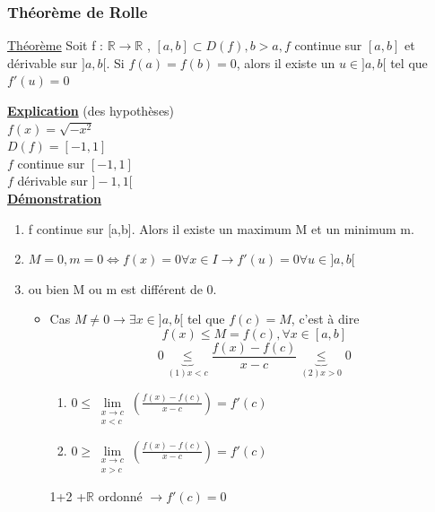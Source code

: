 \documentclass[12pt,a4paper]{article}
\newcommand{\limite}{\lim\limits_}
\newcommand{\llimite}[3]{\limite{\substack{#1 \\ #2}}\left(#3\right)}
\newcommand{\evid}[1]{\textbf{\underline{#1}}}
\newcommand{\R}{\ensuremath{\mathbb{R}} }
\newcommand{\rtor}{\ensuremath{\R \to \R} }
\newcommand{\Theoreme}{\underline{Théorème} }
\begin{document}
{\subsubsection{Théorème de Rolle}
\begin{boite}
	\Theoreme Soit f : \rtor, $[a,b] \subset D(f), b > a, f$ continue sur $[a,b]$ et dérivable sur $]a,b[$. Si $f(a) = f(b) = 0$, alors il existe un $u \in ]a,b[$ tel que $f'(u) = 0$
\end{boite}
\evid{Explication} (des hypothèses)\\
$f(x) = \sqrt{-x^2}$\\
$D(f) = [-1,1]$\\
$f$ continue sur $[-1,1]$\\
$f$ dérivable sur $]-1,1[$\\
\evid{Démonstration}
\begin{enumerate}[label=\roman*]
	\item f continue sur [a,b]. Alors il existe un maximum M et un minimum m.
	\item $M = 0, m = 0 \iff f(x)= 0\forall x \in I \to f'(u) = 0 \forall u \in ]a,b[$
	\item ou bien M ou m est différent de 0.
		\begin{itemize}
			\item Cas $M \neq 0 \to \exists x \in ]a,b[$ tel que $f(c) = M$, c'est à dire
				\begin{equation}
					f(x) \leq M = f(c), \forall x \in [a,b]
				\end{equation}
				\begin{equation}
					0 \underbrace{\leq}_{(1) x < c} \frac{f(x) - f(c)}{x-c} \underbrace{\leq}_{(2) x > 0} 0 	
				\end{equation}
				\begin{enumerate}[label=\arabic*.]
					\item $0 \leq \llimite{x \to c}{x < c}{\frac{f(x)-f(c)}{x-c}} = f'(c)$
					\item $0 \geq \llimite{x \to c}{x > c}{\frac{f(x)-f(c)}{x-c}} = f'(c)$
				\end{enumerate}
				1+2 +\R ordonné $\to f'(c) = 0$
		\end{itemize}
\end{enumerate}
}
\end{document}
